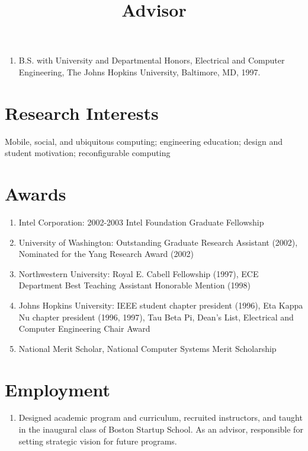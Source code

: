 \documentclass[line]{res}
\begin{document}
\begin{resume}
\begin{enumerate}
		\item B.S. with University and Departmental Honors, Electrical and Computer Engineering, The Johns Hopkins University, Baltimore, MD, 1997.
	\end{enumerate}
	
	\section{\sc Research Interests}
	
	Mobile, social, and ubiquitous computing; engineering education; design and student motivation; reconfigurable computing
	
	\section{\sc Awards}
	\begin{enumerate}
		
		\item Intel Corporation: 2002-2003 Intel Foundation Graduate Fellowship
		
		\item University of Washington: Outstanding Graduate Research Assistant (2002), Nominated for the Yang Research Award (2002)
		
		\item Northwestern University: Royal E. Cabell Fellowship (1997), ECE Department Best Teaching Assistant Honorable Mention (1998)
		
		\item Johns Hopkins University: IEEE student chapter president (1996), Eta Kappa Nu chapter president (1996, 1997), Tau Beta Pi, Dean's List, Electrical and Computer Engineering Chair Award
		
		\item National Merit Scholar, National Computer Systems Merit Scholarship
	\end{enumerate}
	
	\section{\sc Employment}
	\begin{enumerate}
		\item	{} 
		\title{Advisor} 
		 
		\begin{position}
			Designed academic program and curriculum, recruited instructors, and taught in the inaugural class of Boston Startup School. As an advisor, responsible for setting strategic vision for future programs.
		\end{position}


\end{enumerate}
\end{resume}
\end{document}
